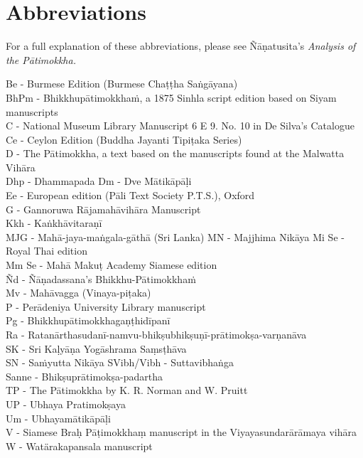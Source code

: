 
\chapter{Abbreviations}
\label{abbreviations}

{\raggedright

For a full explanation of these abbreviations, please see Ñāṇatusita's \textit{Analysis of the Pātimokkha.}

\smallskip

Be - Burmese Edition (Burmese Chaṭṭha Saṅgāyana)\\
BhPm - Bhikkhupātimokkhaṁ, a 1875 Sinhla script edition based on Siyam manuscripts\\
C - National Museum Library Manuscript 6 E 9. No. 10 in De Silva’s Catalogue\\
Ce - Ceylon Edition (Buddha Jayanti Tipiṭaka Series)\\
D - The Pātimokkha, a text based on the manuscripts found at the Malwatta Vihāra\\
Dhp - Dhammapada
Dm - Dve Mātikāpāḷi\\
Ee - European edition (Pāli Text Society P.T.S.), Oxford\\
G - Gannoruwa Rājamahāvihāra Manuscript\\
Kkh - Kaṅkhāvitaraṇī\\
MJG - Mahā-jaya-maṅgala-gāthā (Sri Lanka)
MN - Majjhima Nikāya
Mi Se - Royal Thai edition\\
Mm Se - Mahā Makuṭ Academy Siamese edition\\
Ñd - Ñāṇadassana's Bhikkhu-Pātimokkhaṁ\\
Mv - Mahāvagga (Vinaya-piṭaka)\\
P - Perādeniya University Library manuscript\\
Pg - Bhikkhupātimokkhagaṇṭhidīpanī\\
Ra - Ratanārthasudanī-namvu-bhikṣubhikṣuṇī-prātimokṣa-varṇanāva\\
SK - Sri Kaḷyāṇa Yogāshrama Saṃsṭhāva\\
SN - Saṁyutta Nikāya
SVibh/Vibh - Suttavibhaṅga\\
Sanne - Bhikṣuprātimokṣa-padartha\\
TP - The Pātimokkha by K. R. Norman and W. Pruitt\\
UP - Ubhaya Pratimokṣaya\\
Um - Ubhayamātikāpāḷi\\
V - Siamese Braḥ Pāṭimokkhaṃ manuscript in the Viyayasundarārāmaya vihāra\\
W - Watärakapansala manuscript\\

}

